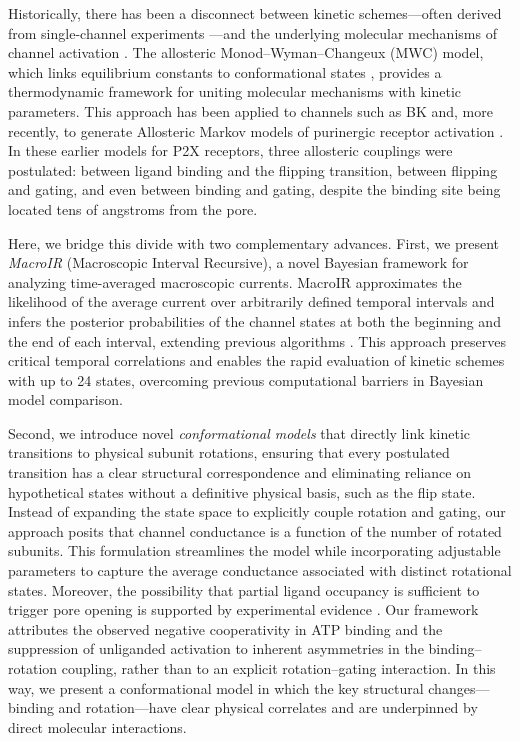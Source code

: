 \documentclass[pdflatex,sn-nature]{sn-jnl}%
\theoremstyle{thmstyleone}%
\theoremstyle{thmstyletwo}%
\theoremstyle{thmstylethree}%
\begin{document}
Historically, there has been a disconnect between kinetic schemes—often derived from single-channel experiments \cite{properties_single_channe}—and the underlying molecular mechanisms of channel activation \cite{Hattori2012MolecularMO}. The allosteric Monod–Wyman–Changeux (MWC) model, which links equilibrium constants to conformational states \cite{Changeux1984AcetylcholineRA}, provides a thermodynamic framework for uniting molecular mechanisms with kinetic parameters. This approach has been applied to channels such as BK \cite{Horrigan2002CouplingBV} and, more recently, to generate Allosteric Markov models of purinergic receptor activation \cite{Moffatt_hume}. In these earlier models for P2X receptors, three allosteric couplings were postulated: between ligand binding and the flipping transition, between flipping and gating, and even between binding and gating, despite the binding site being located tens of angstroms from the pore.

Here, we bridge this divide with two complementary advances. First, we present \textit{MacroIR} (Macroscopic Interval Recursive), a novel Bayesian framework for analyzing time-averaged macroscopic currents. MacroIR approximates the likelihood of the average current over arbitrarily defined temporal intervals and infers the posterior probabilities of the channel states at both the beginning and the end of each interval, extending previous algorithms \cite{Munch2022}. This approach preserves critical temporal correlations and enables the rapid evaluation of kinetic schemes with up to 24 states, overcoming previous computational barriers in Bayesian model comparison.

Second, we introduce novel \textit{conformational models} that directly link kinetic transitions to physical subunit rotations, ensuring that every postulated transition has a clear structural correspondence and eliminating reliance on hypothetical states without a definitive physical basis, such as the flip state. Instead of expanding the state space to explicitly couple rotation and gating, our approach posits that channel conductance is a function of the number of rotated subunits. This formulation streamlines the model while incorporating adjustable parameters to capture the average conductance associated with distinct rotational states. Moreover, the possibility that partial ligand occupancy is sufficient to trigger pore opening is supported by experimental evidence \cite{Stelmashenko2012ActivationOT}. Our framework attributes the observed negative cooperativity in ATP binding \cite{Sattler2020UnravellingTI} and the suppression of unliganded activation \cite{Stelmashenko2012ActivationOT} to inherent asymmetries in the binding–rotation coupling, rather than to an explicit rotation–gating interaction. In this way, we present a conformational model in which the key structural changes—binding and rotation—have clear physical correlates and are underpinned by direct molecular interactions.
\end{document}
